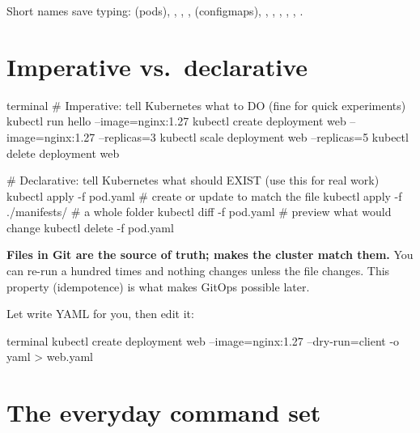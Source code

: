 Short names save typing:  (pods), , , ,
 (configmaps), , , , , , .

\section{Imperative vs.\ declarative}

\begin{bashcode}{terminal}
# Imperative: tell Kubernetes what to DO (fine for quick experiments)
kubectl run hello --image=nginx:1.27
kubectl create deployment web --image=nginx:1.27 --replicas=3
kubectl scale deployment web --replicas=5
kubectl delete deployment web

# Declarative: tell Kubernetes what should EXIST (use this for real work)
kubectl apply -f pod.yaml          # create or update to match the file
kubectl apply -f ./manifests/      # a whole folder
kubectl diff  -f pod.yaml          # preview what would change
kubectl delete -f pod.yaml
\end{bashcode}

\begin{keyidea}
\textbf{Files in Git are the source of truth;  makes the
cluster match them.} You can re-run  a hundred times and nothing
changes unless the file changes. This property (idempotence) is what makes
GitOps possible later.
\end{keyidea}

\begin{protip}
Let  write YAML for you, then edit it:
\begin{bashcode}{terminal}
kubectl create deployment web --image=nginx:1.27 --dry-run=client -o yaml > web.yaml
\end{bashcode}
\end{protip}

\section{The everyday command set}

